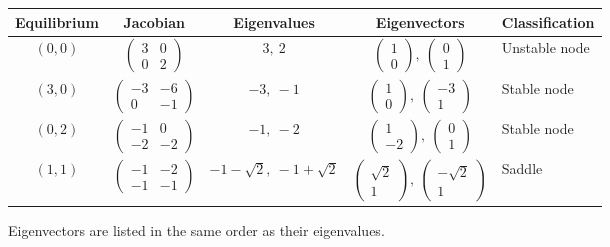\documentclass[10pt,letterpaper]{article}
\begin{document}
\begin{center}
\renewcommand{\arraystretch}{1.7}
\small
\setlength{\tabcolsep}{5pt}
\begin{tabular}{c|c|c|c|l}
Equilibrium & Jacobian & Eigenvalues & Eigenvectors & Classification\\
\hline
$(0,0)$ &
$\begin{pmatrix}3&0\\0&2\end{pmatrix}$ &
$3,\ 2$ &
$\begin{pmatrix}1\\0\end{pmatrix},\ \begin{pmatrix}0\\1\end{pmatrix}$ &
Unstable node\\
$(3,0)$ &
$\begin{pmatrix}-3&-6\\0&-1\end{pmatrix}$ &
$-3,\ -1$ &
$\begin{pmatrix}1\\0\end{pmatrix},\ \begin{pmatrix}-3\\1\end{pmatrix}$ &
Stable node\\
$(0,2)$ &
$\begin{pmatrix}-1&0\\-2&-2\end{pmatrix}$ &
$-1,\ -2$ &
$\begin{pmatrix}1\\-2\end{pmatrix},\ \begin{pmatrix}0\\1\end{pmatrix}$ &
Stable node\\
$(1,1)$ &
$\begin{pmatrix}-1&-2\\-1&-1\end{pmatrix}$ &
$-1-\sqrt2,\ -1+\sqrt2$ &
$\begin{pmatrix}\sqrt2\\1\end{pmatrix},\ \begin{pmatrix}-\sqrt2\\1\end{pmatrix}$ &
Saddle
\end{tabular}

\smallskip
\footnotesize Eigenvectors are listed in the same order as their eigenvalues.
\end{center}
\end{document}
